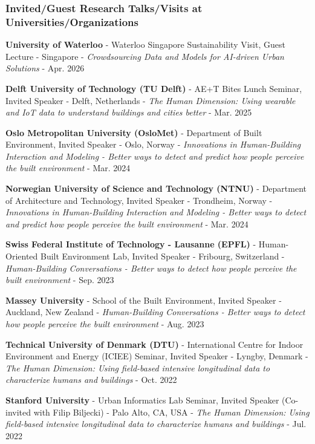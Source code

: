 \documentclass[10pt,a4paper]{article}
\begin{document}
\begin{small}
\subsubsection*{Invited/Guest Research Talks/Visits at Universities/Organizations}
\begin{etaremune}
\item
\textbf{University of Waterloo} - Waterloo Singapore Sustainability Visit, Guest Lecture - Singapore - \emph{Crowdsourcing Data and Models for AI-driven Urban Solutions} - Apr. 2026
\item
\textbf{Delft University of Technology (TU Delft)}  - AE+T Bites Lunch Seminar, Invited Speaker - Delft, Netherlands - \emph{The Human Dimension: Using wearable and IoT data to understand buildings and cities better} - Mar. 2025
\item
\textbf{Oslo Metropolitan University (OsloMet)} - Department of Built Environment, Invited Speaker - Oslo, Norway - \emph{Innovations in Human-Building Interaction and Modeling - Better ways to detect and predict how people perceive the built environment} - Mar. 2024
\item
\textbf{Norwegian University of Science and Technology (NTNU)} - Department of Architecture and Technology, Invited Speaker - Trondheim, Norway - \emph{Innovations in Human-Building Interaction and Modeling - Better ways to detect and predict how people perceive the built environment} - Mar. 2024
\item
\textbf{Swiss Federal Institute of Technology - Lausanne (EPFL)} - Human-Oriented Built Environment Lab, Invited Speaker - Fribourg, Switzerland - \emph{Human-Building Conversations - Better ways to detect how people perceive the built environment} - Sep. 2023
\item
\textbf{Massey University} - School of the Built Environment, Invited Speaker - Auckland, New Zealand - \emph{Human-Building Conversations - Better ways to detect how people perceive the built environment} - Aug. 2023
\item
\textbf{Technical University of Denmark (DTU)} - International Centre for Indoor Environment and Energy (ICIEE) Seminar, Invited Speaker - Lyngby, Denmark - \emph{The Human Dimension: Using field-based intensive longitudinal data to characterize humans and buildings} - Oct. 2022
\item
\textbf{Stanford University} - Urban Informatics Lab Seminar, Invited Speaker (Co-invited with Filip Biljecki) - Palo Alto, CA, USA - \emph{The Human Dimension: Using field-based intensive longitudinal data to characterize humans and buildings} - Jul. 2022

\end{etaremune}
\end{small}
\end{document}

